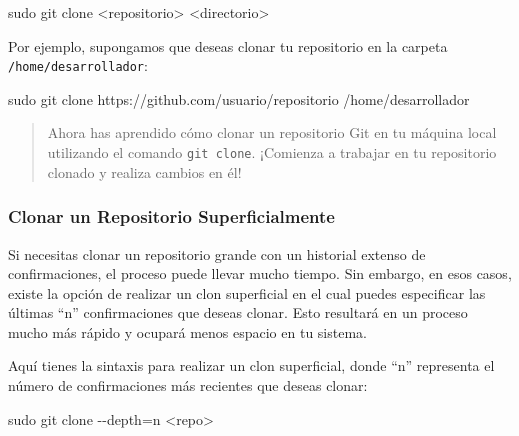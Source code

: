 \documentclass[
  letterpaper,
  DIV=11,
  numbers=noendperiod]{scrartcl}
\newenvironment{Shaded}{}{}
\newcommand{\AttributeTok}[1]{\textcolor[rgb]{0.84,0.23,0.29}{#1}}
\newcommand{\FunctionTok}[1]{\textcolor[rgb]{0.44,0.26,0.76}{#1}}
\newcommand{\NormalTok}[1]{\textcolor[rgb]{0.14,0.16,0.18}{#1}}
\newcommand{\OperatorTok}[1]{\textcolor[rgb]{0.14,0.16,0.18}{#1}}
\begin{document}
\begin{Shaded}
\begin{Highlighting}[]
\FunctionTok{sudo}\NormalTok{ git clone }\OperatorTok{\textless{}}\NormalTok{repositorio}\OperatorTok{\textgreater{}} \OperatorTok{\textless{}}\NormalTok{directorio}\OperatorTok{\textgreater{}}
\end{Highlighting}
\end{Shaded}

Por ejemplo, supongamos que deseas clonar tu repositorio en la carpeta
\texttt{/home/desarrollador}:

\begin{Shaded}
\begin{Highlighting}[]
\FunctionTok{sudo}\NormalTok{ git clone https://github.com/usuario/repositorio /home/desarrollador}
\end{Highlighting}
\end{Shaded}

\begin{quote}
Ahora has aprendido cómo clonar un repositorio Git en tu máquina local
utilizando el comando \texttt{git\ clone}. ¡Comienza a trabajar en tu
repositorio clonado y realiza cambios en él!
\end{quote}

\hypertarget{clonar-un-repositorio-superficialmente}{%
\subsubsection{Clonar un Repositorio
Superficialmente}\label{clonar-un-repositorio-superficialmente}}

Si necesitas clonar un repositorio grande con un historial extenso de
confirmaciones, el proceso puede llevar mucho tiempo. Sin embargo, en
esos casos, existe la opción de realizar un clon superficial en el cual
puedes especificar las últimas ``n'' confirmaciones que deseas clonar.
Esto resultará en un proceso mucho más rápido y ocupará menos espacio en
tu sistema.

Aquí tienes la sintaxis para realizar un clon superficial, donde ``n''
representa el número de confirmaciones más recientes que deseas clonar:

\begin{Shaded}
\begin{Highlighting}[]
\FunctionTok{sudo}\NormalTok{ git clone }\AttributeTok{{-}{-}depth}\OperatorTok{=}\NormalTok{n }\OperatorTok{\textless{}}\NormalTok{repo}\OperatorTok{\textgreater{}}
\end{Highlighting}
\end{Shaded}
\end{document}
